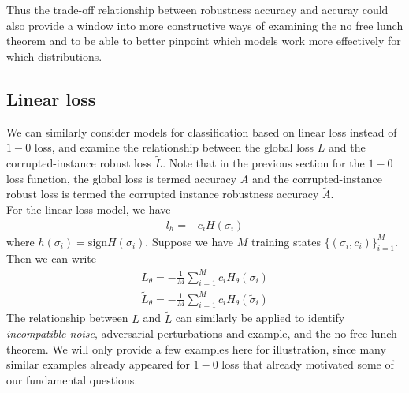 \documentclass[onecolumn,prx, superscriptaddress,longbibliography,margin=1mm 11pt]{revtex4-2}
\begin{document}
Thus the trade-off relationship between robustness accuracy and accuray could also provide a window into more constructive ways of examining the no free lunch theorem and to be able to better pinpoint which models work more effectively for which distributions. 
\subsection{Linear loss}
We can similarly consider models for classification based on linear loss instead of $1-0$ loss, and examine the relationship between the global loss $L$ and the corrupted-instance robust loss $\tilde{L}$. Note that in the previous section for the $1-0$ loss function, the global loss is termed accuracy $A$ and the corrupted-instance robust loss is termed the corrupted instance robustness accuracy $\tilde{A}$. \\

For the linear loss model, we have
\begin{align}
    l_h=-c_i H(\sigma_i)
\end{align}
where $h(\sigma_i)=\text{sign}H(\sigma_i)$. Suppose we have $M$ training states $\{(\sigma_i, c_i)\}_{i=1}^M$. Then we can write
\begin{align}
    L_{\theta}=-\frac{1}{M}\sum_{i=1}^M c_i H_{\theta}(\sigma_i) \nonumber \\
    \tilde{L}_{\theta}=-\frac{1}{M}\sum_{i=1}^M c_i H_{\theta}(\tilde{\sigma}_i)
\end{align}
The relationship between $L$ and $\tilde{L}$ can similarly be applied to identify \textit{incompatible noise}, adversarial perturbations and example, and the no free lunch theorem. We will only provide a few examples here for illustration, since many similar examples already appeared for $1-0$ loss that already motivated some of our fundamental questions. \\
\end{document}
